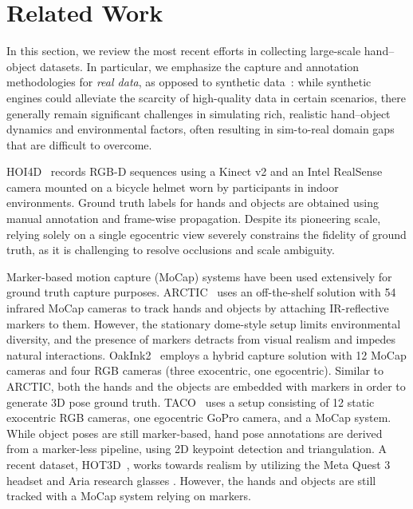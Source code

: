 \documentclass[10pt,twocolumn,letterpaper]{article}
\begin{document}
\section{Related Work}
\label{sec:relatedwork}

In this section, we review the most recent efforts in collecting large-scale hand–object datasets. 
In particular, we emphasize the capture and annotation methodologies for \emph{real data}, as opposed to synthetic data~\cite{hewitt2024lookma,GANeratedHands_CVPR2018,li2023renderih}: while synthetic engines could alleviate the scarcity of high-quality data in certain scenarios, there generally remain significant challenges in simulating rich, realistic hand–object dynamics and environmental factors, often resulting in sim-to-real domain gaps that are difficult to overcome.

HOI4D~\cite{liu2022hoi4d} records RGB-D sequences using a Kinect v2 and an Intel RealSense camera mounted on a bicycle helmet worn by participants in indoor environments. Ground truth labels for hands and objects are obtained using manual annotation and frame-wise propagation. Despite its pioneering scale, relying solely on a single egocentric view severely constrains the fidelity of ground truth, as it is challenging to resolve occlusions and scale ambiguity.

Marker-based motion capture (MoCap) systems have been used extensively for ground truth capture purposes.
ARCTIC~\cite{fan2023arctic} uses 
an off-the-shelf solution with 54 infrared MoCap cameras to track hands and objects by attaching IR-reflective markers to them.
However, the stationary dome-style setup limits environmental diversity, and the presence of markers detracts from visual realism and impedes natural interactions.
OakInk2~\cite{zhan2024oakink2} employs a hybrid capture solution with 12 MoCap cameras and four RGB cameras (three exocentric, one egocentric). Similar to ARCTIC, both the hands and the objects are embedded with markers in order to generate 3D pose ground truth.
TACO~\cite{liu2024taco} uses a setup consisting of 12 static exocentric RGB cameras, one egocentric GoPro camera, and a MoCap system. 
While object poses are still marker-based, hand pose annotations are derived from a marker-less pipeline, using 2D keypoint detection and triangulation.
A recent dataset, HOT3D~\cite{banerjee2025hot3d}, works towards realism by utilizing the Meta Quest 3 headset and Aria research glasses \cite{engel2023projectarianewtool}.
However, the hands and objects are still tracked with a MoCap system relying on markers.
\end{document}
